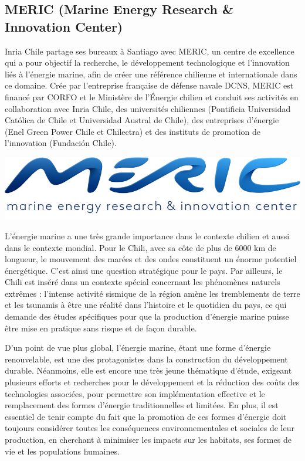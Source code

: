 \subsection{MERIC (Marine Energy Research \& Innovation Center)}

\indent Inria Chile partage ses bureaux à Santiago avec MERIC, un centre de excellence qui a pour objectif la recherche, le développement technologique et l'innovation liés à l'énergie marine, afin de créer une référence chilienne et internationale dans ce domaine. Crée par l'entreprise française de défense navale DCNS, MERIC est financé par CORFO et le Ministère de l'Énergie chilien et conduit ses activités en collaboration avec Inria Chile, des universités chiliennes (Pontificia Universidad Católica de Chile et Universidad Austral de Chile), des entreprises d'énergie (Enel Green Power Chile et Chilectra) et des instituts de promotion de l'innovation (Fundación Chile).  

\indent

\indent

\begingroup
\centering
\includegraphics[scale=.3]{figures/logos/meric.png}
\endgroup

\indent

\indent L'énergie marine a une très grande importance dans le contexte chilien et aussi dans le contexte mondial. Pour le Chili, avec sa côte de plus de 6000 km de longueur, le mouvement des marées et des ondes constituent un énorme potentiel énergétique. C'est ainsi une question stratégique pour le pays. Par ailleurs, le Chili est inséré dans un contexte spécial concernant les phénomènes naturels extrêmes : l'intense activité sismique de la région amène les tremblements de terre et les tsunamis à être une réalité dans l'histoire et le quotidien du pays, ce qui demande des études spécifiques pour que la production d'énergie marine puisse être mise en pratique sans risque et de façon durable.

\indent D'un point de vue plus global, l'énergie marine, étant une forme d'énergie renouvelable, est une des protagonistes dans la construction du développement durable. Néanmoins, elle est encore une très jeune thématique d'étude, exigeant plusieurs efforts et recherches pour le développement et la réduction des coûts des technologies associées, pour permettre son implémentation effective et le remplacement des formes d'énergie traditionnelles et limitées. En plus, il est essentiel de tenir compte du fait que la promotion de ces formes d'énergie doit toujours considérer toutes les conséquences environnementales et sociales de leur production, en cherchant à minimiser les impacts sur les habitats, ses formes de vie et les populations humaines.

